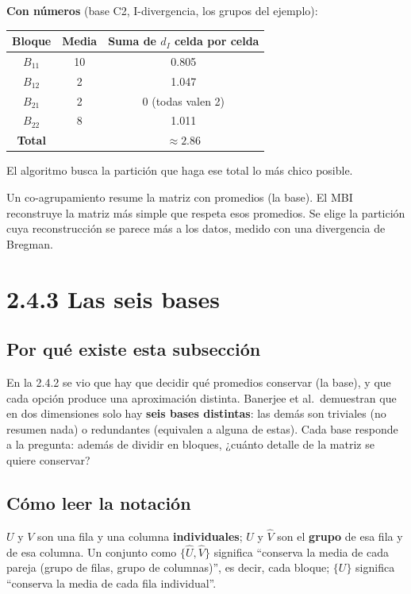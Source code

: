 \documentclass[11pt,a4paper]{article}
\newenvironment{idea}{\par\begin{center}\begin{lrbox}{\ideabox}\begin{minipage}{0.9\linewidth}}{\end{minipage}\end{lrbox}\fcolorbox{blue!40!black}{blue!5}{\usebox{\ideabox}}\end{center}}
\begin{document}
\textbf{Con números} (base C2, I-divergencia, los grupos del ejemplo):
\begin{center}
\begin{tabular}{ccc}
\toprule
Bloque & Media & Suma de $d_I$ celda por celda \\
\midrule
$B_{11}$ & 10 & 0.805 \\
$B_{12}$ & 2 & 1.047 \\
$B_{21}$ & 2 & 0 (todas valen 2) \\
$B_{22}$ & 8 & 1.011 \\
\midrule
\textbf{Total} & & $\approx 2.86$ \\
\bottomrule
\end{tabular}
\end{center}
El algoritmo busca la partición que haga ese total lo más chico posible.

\begin{idea}
Un co-agrupamiento resume la matriz con promedios (la base). El MBI reconstruye la
matriz más simple que respeta esos promedios. Se elige la partición cuya
reconstrucción se parece más a los datos, medido con una divergencia de Bregman.
\end{idea}

\section{2.4.3 Las seis bases}

\subsection{Por qué existe esta subsección}

En la 2.4.2 se vio que hay que decidir qué promedios conservar (la base), y que
cada opción produce una aproximación distinta. Banerjee et al.\ demuestran que en
dos dimensiones solo hay \textbf{seis bases distintas}: las demás son triviales (no
resumen nada) o redundantes (equivalen a alguna de estas). Cada base responde a la
pregunta: además de dividir en bloques, ¿cuánto detalle de la matriz se quiere
conservar?

\subsection{Cómo leer la notación}

$U$ y $V$ son una fila y una columna \textbf{individuales}; $\hat U$ y $\hat V$
son el \textbf{grupo} de esa fila y de esa columna. Un conjunto como
$\{\hat U,\hat V\}$ significa ``conserva la media de cada pareja (grupo de filas,
grupo de columnas)'', es decir, cada bloque; $\{U\}$ significa ``conserva la media
de cada fila individual''.
\end{document}
